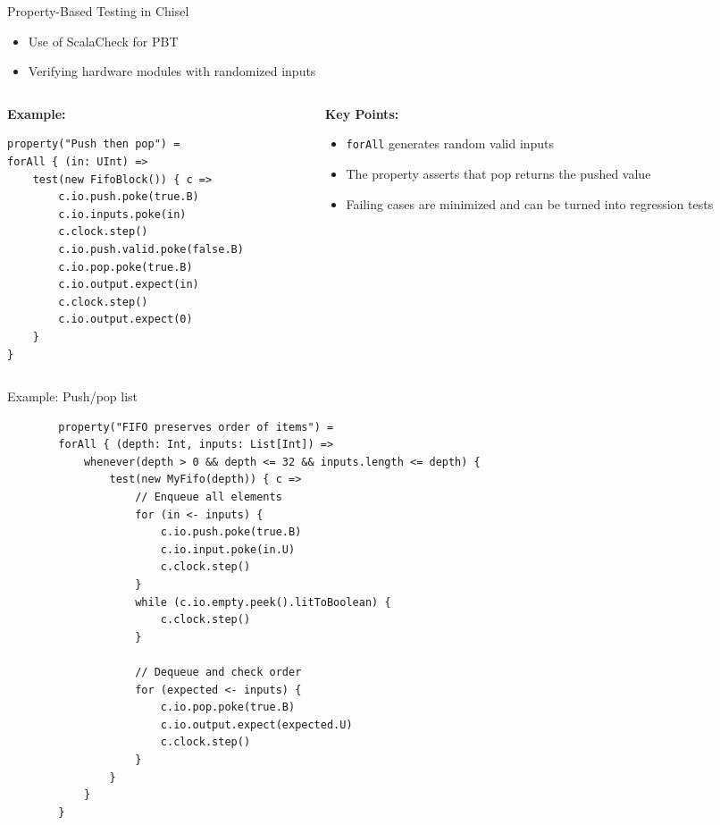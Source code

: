 \begin{frame}[fragile]{Property-Based Testing in Chisel}
	\begin{itemize}
		\item Use of ScalaCheck for PBT
		\item Verifying hardware modules with randomized inputs
	\end{itemize}
	
	\vspace{1em}
	
	\begin{columns}
		\begin{column}{0.6\textwidth}
	\textbf{Example:}
	\begin{verbatim}
property("Push then pop") = 
forAll { (in: UInt) =>
	test(new FifoBlock()) { c =>
		c.io.push.poke(true.B)
		c.io.inputs.poke(in)
		c.clock.step()
		c.io.push.valid.poke(false.B)
		c.io.pop.poke(true.B)
		c.io.output.expect(in)
		c.clock.step()
		c.io.output.expect(0)
	}
}
	\end{verbatim}
	\end{column}
	\begin{column}{0.4\textwidth}
		\textbf{Key Points:}
		\begin{itemize}
			\item \texttt{forAll} generates random valid inputs
			\item The property asserts that pop returns the pushed value
			\item Failing cases are minimized and can be turned into regression tests
		\end{itemize}
	\end{column}
	\end{columns}
	
\end{frame}

\begin{frame}[fragile]{Example: Push/pop list}
	\scriptsize
	\begin{verbatim}
		property("FIFO preserves order of items") = 
		forAll { (depth: Int, inputs: List[Int]) =>
			whenever(depth > 0 && depth <= 32 && inputs.length <= depth) {
				test(new MyFifo(depth)) { c =>
					// Enqueue all elements
					for (in <- inputs) {
						c.io.push.poke(true.B)
						c.io.input.poke(in.U)
						c.clock.step()
					}
					while (c.io.empty.peek().litToBoolean) {
						c.clock.step()
					}
					
					// Dequeue and check order
					for (expected <- inputs) {
						c.io.pop.poke(true.B)
						c.io.output.expect(expected.U)
						c.clock.step()
					}
				}
			}
		}
	\end{verbatim}
	
\end{frame}

